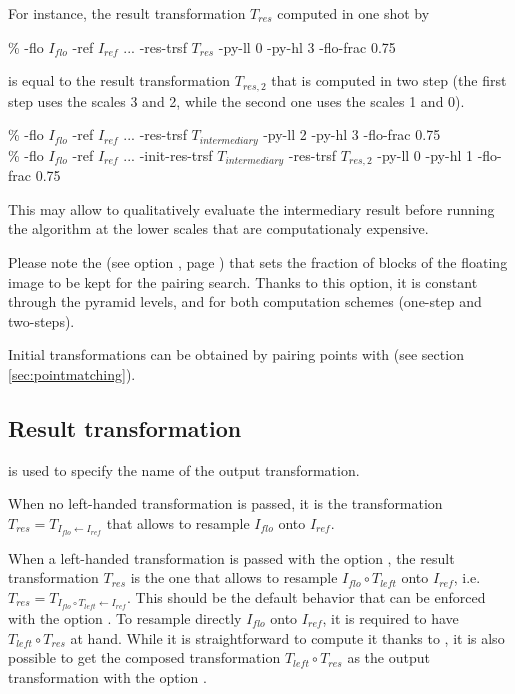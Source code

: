\begin{itemize}
For instance, the result transformation $T_{res}$ computed in one shot by
\begin{code}{1}
\% \blockmatching -flo $I_{flo}$ -ref $I_{ref}$ ...  -res-trsf
$T_{res}$ -py-ll 0 -py-hl 3 -flo-frac 0.75
\end{code}
is equal to the result transformation $T_{res,2}$ that is computed in two step (the first step uses the scales 3 and 2, while the second one uses the scales 1 and 0).
\begin{code}{1}
\% \blockmatching -flo $I_{flo}$ -ref $I_{ref}$ ...  -res-trsf
$T_{intermediary}$ -py-ll 2 -py-hl 3 -flo-frac 0.75 \\
\% \blockmatching -flo $I_{flo}$ -ref $I_{ref}$ ...  -init-res-trsf
$T_{intermediary}$ -res-trsf $T_{res,2}$ -py-ll 0 -py-hl 1 -flo-frac 0.75
\end{code}
This may allow to qualitatively evaluate the intermediary result before running the algorithm at the lower scales that are computationaly expensive.

\begin{note}
Please note the  (see option
, page
\pageref{opt:floating:selection:fraction}) that sets the fraction of
blocks of the floating image to be kept for the pairing search. Thanks
to this option, it is constant through the pyramid levels, and for
both computation schemes (one-step and two-steps).
\end{note}

\end{itemize}

Initial transformations can be obtained by pairing points with \pointmatching (see section \ref{sec:pointmatching}).



\subsection{Result transformation}

 is used to specify the name of
the output transformation.

When no left-handed transformation is passed, it is the transformation $T_{res} = T_{I_{flo} \leftarrow
  I_{ref}}$ that allows to resample $I_{flo}$ onto $I_{ref}$.

When a left-handed transformation is passed with the option
, the result transformation $T_{res}$ is
the one that allows to resample  $I_{flo} \circ T_{left}$ onto
$I_{ref}$, i.e. $T_{res} = T_{I_{flo} \circ T_{left} \leftarrow
  I_{ref}}$. 
%
This should be the default behavior that can
be enforced with the option .
%
To resample directly $I_{flo}$ onto $I_{ref}$, it is required to have
$T_{left} \circ T_{res}$ at hand. While it is straightforward to
compute it thanks to \composeTrsf, it is also possible to get the
composed transformation $T_{left} \circ T_{res}$ as the output
transformation with the option .


